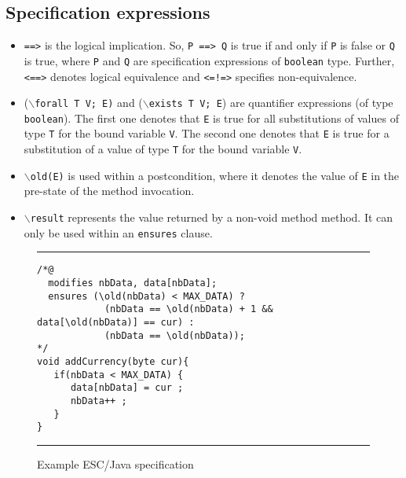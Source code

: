 \documentclass[a4paper]{llncs}
\begin{document}
\subsection{Specification expressions}
\begin{itemize}
\item{\texttt{==>}} is the logical implication. So, \texttt{P
==> Q} is true if and only if \texttt{P} is false or \texttt{Q} is
true, where \texttt{P} and \texttt{Q} are specification expressions of 
\texttt{boolean} type. Further, \texttt{<==>} denotes
logical equivalence and \texttt{<=!=>} specifies non-equivalence.

\item {($\backslash$\texttt{forall T V; E)} and
($\backslash$\texttt{exists T V; E})} are quantifier expressions (of
type \texttt{boolean}).  The first one denotes that \texttt{E} is true
for all substitutions of values of type \texttt{T} for the bound
variable \texttt{V}. The second one denotes that \texttt{E} is true
for a substitution of a value of type \texttt{T} for the bound
variable \texttt{V}.

\item{\texttt{$\backslash$old(E)}} is used within a postcondition, where it denotes the value of \texttt{E} in the pre-state of the method invocation.

\item {\tt$\backslash$result} represents the value returned by
a non-void method method. It can only be used within an
\texttt{ensures} clause.
\end{itemize}


\begin{figure}[t]
\rule{\linewidth}{0.3mm}
\begin{verbatim}
/*@
  modifies nbData, data[nbData];
  ensures (\old(nbData) < MAX_DATA) ?
            (nbData == \old(nbData) + 1 && data[\old(nbData)] == cur) :
            (nbData == \old(nbData));
*/
void addCurrency(byte cur){
   if(nbData < MAX_DATA) {
      data[nbData] = cur ;
      nbData++ ;
   }
}
\end{verbatim}
\caption{Example ESC/Java specification}
\label{fig-add-cur}
\rule{\linewidth}{0.3mm}
\end{figure}
\end{document}
